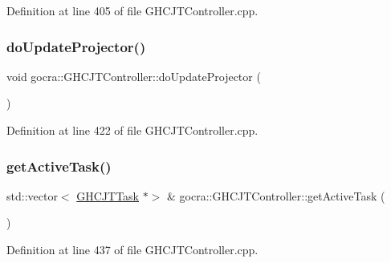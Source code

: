 Definition at line 405 of file G\+H\+C\+J\+T\+Controller.\+cpp.

\hypertarget{classgocra_1_1GHCJTController_a5d54c1726d3b72f04f0a1e9cffd91bde}{}\label{classgocra_1_1GHCJTController_a5d54c1726d3b72f04f0a1e9cffd91bde} 
\subsubsection{\texorpdfstring{do\+Update\+Projector()}{doUpdateProjector()}}
{\footnotesize\ttfamily void gocra\+::\+G\+H\+C\+J\+T\+Controller\+::do\+Update\+Projector (\begin{DoxyParamCaption}{ }\end{DoxyParamCaption})}



Definition at line 422 of file G\+H\+C\+J\+T\+Controller.\+cpp.

\hypertarget{classgocra_1_1GHCJTController_a159c5708a2da97b1b8669a6dc586f8bf}{}\label{classgocra_1_1GHCJTController_a159c5708a2da97b1b8669a6dc586f8bf} 
\subsubsection{\texorpdfstring{get\+Active\+Task()}{getActiveTask()}}
{\footnotesize\ttfamily std\+::vector$<$ \hyperlink{classgocra_1_1GHCJTTask}{G\+H\+C\+J\+T\+Task} $\ast$$>$ \& gocra\+::\+G\+H\+C\+J\+T\+Controller\+::get\+Active\+Task (\begin{DoxyParamCaption}{ }\end{DoxyParamCaption})}



Definition at line 437 of file G\+H\+C\+J\+T\+Controller.\+cpp.

\hypertarget{classgocra_1_1GHCJTController_ac687ebab107bcd79828564b0adad2e10}{}\label{classgocra_1_1GHCJTController_ac687ebab107bcd79828564b0adad2e10} 
